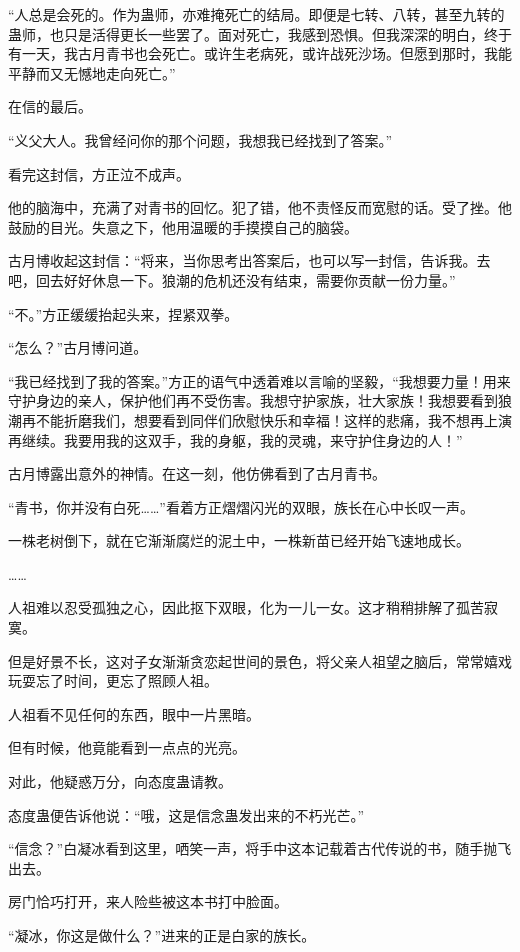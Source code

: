 \begin{this_body}
“人总是会死的。作为蛊师，亦难掩死亡的结局。即便是七转、八转，甚至九转的蛊师，也只是活得更长一些罢了。面对死亡，我感到恐惧。但我深深的明白，终于有一天，我古月青书也会死亡。或许生老病死，或许战死沙场。但愿到那时，我能平静而又无憾地走向死亡。”

在信的最后。

“义父大人。我曾经问你的那个问题，我想我已经找到了答案。”

看完这封信，方正泣不成声。

他的脑海中，充满了对青书的回忆。犯了错，他不责怪反而宽慰的话。受了挫。他鼓励的目光。失意之下，他用温暖的手摸摸自己的脑袋。

古月博收起这封信：“将来，当你思考出答案后，也可以写一封信，告诉我。去吧，回去好好休息一下。狼潮的危机还没有结束，需要你贡献一份力量。”

“不。”方正缓缓抬起头来，捏紧双拳。

“怎么？”古月博问道。

“我已经找到了我的答案。”方正的语气中透着难以言喻的坚毅，“我想要力量！用来守护身边的亲人，保护他们再不受伤害。我想守护家族，壮大家族！我想要看到狼潮再不能折磨我们，想要看到同伴们欣慰快乐和幸福！这样的悲痛，我不想再上演再继续。我要用我的这双手，我的身躯，我的灵魂，来守护住身边的人！”

古月博露出意外的神情。在这一刻，他仿佛看到了古月青书。

“青书，你并没有白死……”看着方正熠熠闪光的双眼，族长在心中长叹一声。

一株老树倒下，就在它渐渐腐烂的泥土中，一株新苗已经开始飞速地成长。

……

人祖难以忍受孤独之心，因此抠下双眼，化为一儿一女。这才稍稍排解了孤苦寂寞。

但是好景不长，这对子女渐渐贪恋起世间的景色，将父亲人祖望之脑后，常常嬉戏玩耍忘了时间，更忘了照顾人祖。

人祖看不见任何的东西，眼中一片黑暗。

但有时候，他竟能看到一点点的光亮。

对此，他疑惑万分，向态度蛊请教。

态度蛊便告诉他说：“哦，这是信念蛊发出来的不朽光芒。”

“信念？”白凝冰看到这里，哂笑一声，将手中这本记载着古代传说的书，随手抛飞出去。

房门恰巧打开，来人险些被这本书打中脸面。

“凝冰，你这是做什么？”进来的正是白家的族长。


\end{this_body}
